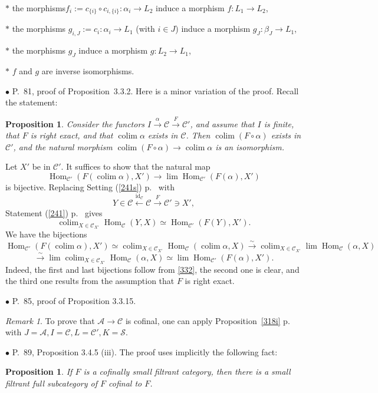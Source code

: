 \documentclass[12pt]{article}
\newtheorem{prop}[thm]{Proposition}
\theoremstyle{remark}%
\newtheorem{rk}[thm]{Remark}
\newcommand{\bu}{\bullet}
\newcommand{\n}{\noindent}
\newcommand{\cc}{\mathcal}
\newcommand{\A}{\mathcal A}
\newcommand{\C}{\mathcal C}
\newcommand{\xr}{\xrightarrow}
\newcommand{\be}{\begin{equation}}
\newcommand{\ee}{\end{equation}}
\newcommand{\pr}{Proposition}
\DeclareMathOperator*{\co}{colim}
\DeclareMathOperator{\id}{id}
\DeclareMathOperator{\h}{Hom}
\begin{document}
\n$*$ the morphisms$f_i:=c_{\{i\}}\circ c_{i,\{i\}}:\alpha_i\to L_2$ induce a morphism $f:L_1\to L_2$, 

\n$*$ the morphisms $g_{i,J}:=c_i:\alpha_i\to L_1$ (with $i\in J$) induce a morphism $g_J:\beta_J\to L_1$, 

\n$*$ the morphisms $g_J$ induce a morphism $g:L_2\to L_1$, 

\n$*$ $f$ and $g$ are inverse isomorphisms. 


\n$\bu$ P.~81, proof of \pr\ 3.3.2. Here is a minor variation of the proof. Recall the statement: 
% 
\begin{prop} 
% 
Consider the functors $I\xrightarrow\alpha\C\xrightarrow F\C'$, and assume that $I$ is finite, that $F$ is right exact, and that $\co\alpha$ exists in $\C$. Then $\co(F\circ\alpha)$ exists in $\C'$, and the natural morphism $\co(F\circ\alpha)\to\co\alpha$ is an isomorphism. 
%
\end{prop} 
% 
\n{\em Proof.} Let $X'$ be in $\C'$. It suffices to show that the natural map  
$$
\h_{\C'}(F(\co\alpha),X')\to\lim\h_{\C'}(F(\alpha),X')
$$ 
% 
is bijective. Replacing Setting (\ref{241s}) p.~\pageref{241s} with 
$$
Y\in\C\xleftarrow{\id_\C}\C\xrightarrow{F}\C'\ni X', 
$$ 
Statement (\ref{241}) p.~\pageref{241} gives 
% 
\be\label{332} 
\co_{X\in\C_{X'}}\h_\C(Y,X)\simeq\h_{\C'}(F(Y),X').  
\ee 
% 
We have the bijections 
$$ 
\h_{\C'}(F(\co\alpha),X')\simeq\co_{X\in\C_{X'}}\h_\C(\co\alpha,X)\xr\sim\co_{X\in\C_{X'}}\lim\h_\C(\alpha,X) 
$$ 
$$
\xr\sim\lim\co_{X\in\C_{X'}}\h_\C(\alpha,X)\simeq\lim\h_{\C'}(F(\alpha),X'). 
$$ 
Indeed, the first and last bijections follow from \eqref{332}, the second one is clear, and the third one results from the assumption that $F$ is right exact. 


\n$\bu$ P.~85, proof of Proposition 3.3.15. 
%
\begin{rk}\label{3315}  
% 
To prove that $\A\to\C$ is cofinal, one can apply \pr\ \ref{318i} p.~\pageref{318i} with $J=\A,I=\C,L=\C',K=\cc S$. 
%
\end{rk} 


\n$\bu$ P.~89, Proposition 3.4.5 (iii). The proof uses implicitly the following fact: 

\begin{prop}\label{355} 
If $F$ is a cofinally small filtrant category, then there is a small {\em filtrant} full subcategory of $F$ cofinal to $F$. 
\end{prop}
\end{document}
